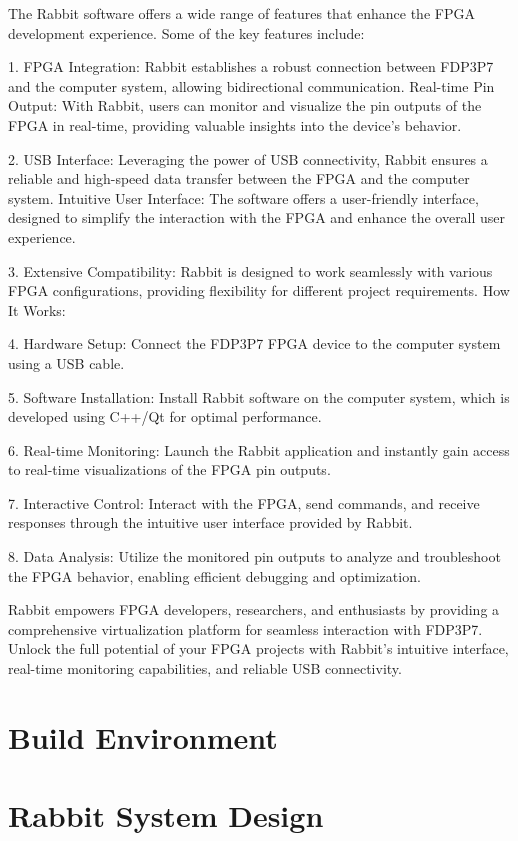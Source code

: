 \documentclass{article}
\begin{document}
The Rabbit software offers a wide range of features that enhance the FPGA development experience. Some of the key features include:

1. FPGA Integration: Rabbit establishes a robust connection between FDP3P7 and the computer system, allowing bidirectional communication.
Real-time Pin Output: With Rabbit, users can monitor and visualize the pin outputs of the FPGA in real-time, providing valuable insights into the device's behavior.

2. USB Interface: Leveraging the power of USB connectivity, Rabbit ensures a reliable and high-speed data transfer between the FPGA and the computer system.
Intuitive User Interface: The software offers a user-friendly interface, designed to simplify the interaction with the FPGA and enhance the overall user experience.

3. Extensive Compatibility: Rabbit is designed to work seamlessly with various FPGA configurations, providing flexibility for different project requirements.
How It Works:

4. Hardware Setup: Connect the FDP3P7 FPGA device to the computer system using a USB cable.

5. Software Installation: Install Rabbit software on the computer system, which is developed using C++/Qt for optimal performance.

6. Real-time Monitoring: Launch the Rabbit application and instantly gain access to real-time visualizations of the FPGA pin outputs.

7. Interactive Control: Interact with the FPGA, send commands, and receive responses through the intuitive user interface provided by Rabbit.

8. Data Analysis: Utilize the monitored pin outputs to analyze and troubleshoot the FPGA behavior, enabling efficient debugging and optimization.

Rabbit empowers FPGA developers, researchers, and enthusiasts by providing a comprehensive virtualization platform for seamless interaction with FDP3P7. Unlock the full potential of your FPGA projects with Rabbit's intuitive interface, real-time monitoring capabilities, and reliable USB connectivity.

\section{Build Environment}

\section{Rabbit System Design}
\end{document}
